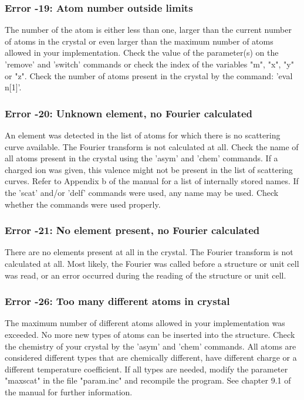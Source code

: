 \subsubsection{Error -19: Atom number outside limits}
\par
The number of the atom is either less than one, larger than the current 
number of atoms in the crystal or even larger than the maximum 
number of atoms allowed in your implementation. 
Check the value of the parameter(s) on the 'remove' and 'switch' 
commands or check the index of the variables "m", "x", "y" or "z". 
Check the number of atoms present in the crystal by the command: 
'eval n[1]'. 
\subsubsection{Error -20: Unknown element, no Fourier calculated}
\par
An element was detected in the list of atoms for which there is no 
scattering curve available. The Fourier transform is not calculated 
at all. Check the name of all atoms present in the crystal using 
the 'asym' and 'chem' commands. If a charged ion was given, this 
valence might not be present in the list of scattering curves. 
Refer to Appendix b of the manual for a list of internally stored 
names. 
If the 'scat' and/or 'delf' commands were used, any name may be used. 
Check whether the commands were used properly. 
\subsubsection{Error -21: No element present, no Fourier calculated}
\par
There are no elements present at all in the crystal. The Fourier 
transform is not calculated at all. Most likely, the Fourier 
was called before a structure or unit cell was read, or an error 
occurred during the reading of the structure or unit cell. 
\subsubsection{Error -26: Too many different atoms in crystal}
\par
The maximum number of different atoms allowed in your implementation 
was exceeded. No more new types of atoms can be inserted into the 
structure. Check the chemistry of your crystal by the 'asym' and 
'chem' commands. All atoms are considered different types that are 
chemically different, have different charge or a different temperature 
coefficient. If all types are needed, modify the parameter "maxscat" 
in the file "param.inc" and recompile the program. See chapter 9.1 
of the manual for further information. 
